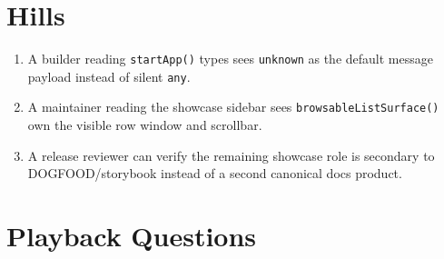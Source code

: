 \section{Hills}\label{record-131-hills}

\begin{enumerate}
\def\labelenumi{\arabic{enumi}.}
\tightlist
\item
  A builder reading \texttt{s\allowbreak{}t\allowbreak{}a\allowbreak{}r\allowbreak{}t\allowbreak{}A\allowbreak{}p\allowbreak{}p\allowbreak{}(\allowbreak{})} types sees \texttt{u\allowbreak{}n\allowbreak{}k\allowbreak{}n\allowbreak{}o\allowbreak{}w\allowbreak{}n} as the default message payload instead of silent \texttt{a\allowbreak{}n\allowbreak{}y}.
\item
  A maintainer reading the showcase sidebar sees \texttt{b\allowbreak{}r\allowbreak{}o\allowbreak{}w\allowbreak{}s\allowbreak{}a\allowbreak{}b\allowbreak{}l\allowbreak{}e\allowbreak{}L\allowbreak{}i\allowbreak{}s\allowbreak{}t\allowbreak{}S\allowbreak{}u\allowbreak{}r\allowbreak{}f\allowbreak{}a\allowbreak{}c\allowbreak{}e\allowbreak{}(\allowbreak{})} own the visible row window and scrollbar.
\item
  A release reviewer can verify the remaining showcase role is secondary to DOGFOOD/storybook instead of a second canonical docs product.
\end{enumerate}

\section{Playback Questions}\label{record-131-playback-questions}

